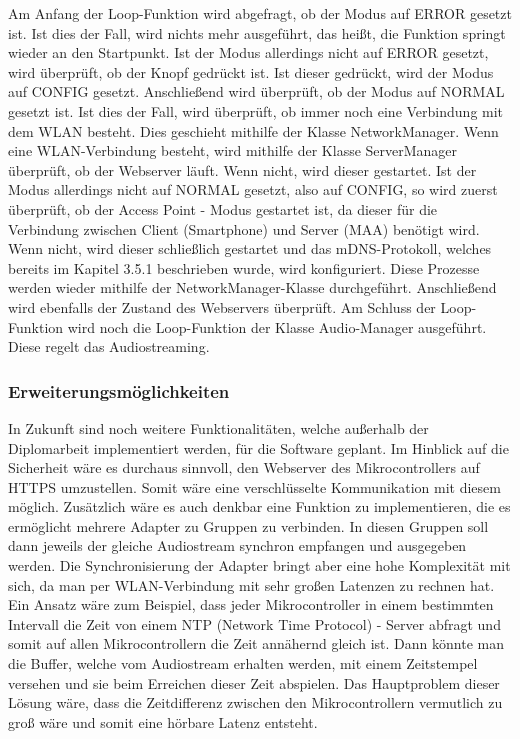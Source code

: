 \documentclass[11pt, twoside]{article}
\begin{document}
Am Anfang der Loop-Funktion wird abgefragt, ob der Modus auf \glqq ERROR\grqq{} gesetzt ist. Ist dies der Fall, wird nichts mehr ausgeführt, das heißt, die Funktion springt wieder an den Startpunkt. Ist der Modus allerdings nicht auf \glqq ERROR\grqq{} gesetzt, wird überprüft, ob der Knopf gedrückt ist. Ist dieser gedrückt, wird der Modus auf \glqq CONFIG\grqq{} gesetzt. Anschließend wird überprüft, ob der Modus auf \glqq NORMAL\grqq{} gesetzt ist. Ist dies der Fall, wird überprüft, ob immer noch eine Verbindung mit dem WLAN besteht. Dies geschieht mithilfe der Klasse \glqq NetworkManager\grqq{}. Wenn eine WLAN-Verbindung besteht, wird mithilfe der Klasse \glqq ServerManager\grqq{} überprüft, ob der Webserver läuft. Wenn nicht, wird dieser gestartet. Ist der Modus allerdings nicht auf \glqq NORMAL\grqq{} gesetzt, also auf \glqq CONFIG\grqq{}, so wird zuerst überprüft, ob der Access Point - Modus gestartet ist, da dieser für die Verbindung zwischen Client (Smartphone) und Server (MAA) benötigt wird. Wenn nicht, wird dieser schließlich gestartet und das mDNS-Protokoll, welches bereits im Kapitel 3.5.1 beschrieben wurde, wird konfiguriert. Diese Prozesse werden wieder mithilfe der \glqq NetworkManager\grqq{}-Klasse durchgeführt. Anschließend wird ebenfalls der Zustand des Webservers überprüft. Am Schluss der Loop-Funktion wird noch die Loop-Funktion der Klasse Audio-Manager ausgeführt. Diese regelt das Audiostreaming.
\subsubsection{Erweiterungsmöglichkeiten}
In Zukunft sind noch weitere Funktionalitäten, welche außerhalb der Diplomarbeit implementiert werden, für die Software geplant. Im Hinblick auf die Sicherheit wäre es durchaus sinnvoll, den Webserver des Mikrocontrollers auf HTTPS umzustellen. Somit wäre eine verschlüsselte Kommunikation mit diesem möglich. Zusätzlich wäre es auch denkbar eine Funktion zu implementieren, die es ermöglicht mehrere Adapter zu Gruppen zu verbinden. In diesen Gruppen soll dann jeweils der gleiche Audiostream synchron empfangen und ausgegeben werden. Die Synchronisierung der Adapter bringt aber eine hohe Komplexität mit sich, da man per WLAN-Verbindung mit sehr großen Latenzen zu rechnen hat. Ein Ansatz wäre zum Beispiel, dass jeder Mikrocontroller in einem bestimmten Intervall die Zeit von einem NTP (Network Time Protocol) - Server abfragt und somit auf allen Mikrocontrollern die Zeit annähernd gleich ist. Dann könnte man die Buffer, welche vom Audiostream erhalten werden, mit einem Zeitstempel versehen und sie beim Erreichen dieser Zeit abspielen. Das Hauptproblem dieser Lösung wäre, dass die Zeitdifferenz zwischen den Mikrocontrollern vermutlich zu groß wäre und somit eine hörbare Latenz entsteht.
\end{document}
